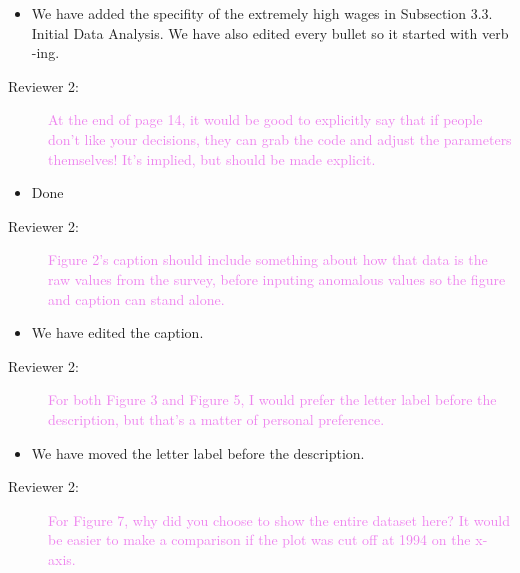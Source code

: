 \documentclass[12pt,a4paper,]{article}
\providecommand{\tightlist}{%
  \setlength{\itemsep}{0pt}\setlength{\parskip}{0pt}}
\begin{document}
\begin{itemize}
\tightlist
\item
  We have added the specifity of the extremely high wages in Subsection 3.3. Initial Data Analysis. We have also edited every bullet so it started with verb -ing.
\end{itemize}

\begin{description}
\item[Reviewer 2:]\textcolor{violet}{At the end of page 14, it would be good to explicitly say that if people don’t like your decisions, they can grab the code and adjust the parameters themselves! It’s implied, but should be made explicit.}
\end{description}

\begin{itemize}
\tightlist
\item
  Done
\end{itemize}

\begin{description}
\item[Reviewer 2:]\textcolor{violet}{Figure 2’s caption should include something about how that data is the raw values from the survey, before inputing anomalous values so the figure and caption can stand alone.}
\end{description}

\begin{itemize}
\tightlist
\item
  We have edited the caption.
\end{itemize}

\begin{description}
\item[Reviewer 2:]\textcolor{violet}{For both Figure 3 and Figure 5, I would prefer the letter label before the description, but that’s a matter of personal preference.}
\end{description}

\begin{itemize}
\tightlist
\item
  We have moved the letter label before the description.
\end{itemize}

\begin{description}
\item[Reviewer 2:]\textcolor{violet}{For Figure 7, why did you choose to show the entire dataset here? It would be easier to make a comparison if the plot was cut off at 1994 on the x-axis.}
\end{description}
\end{document}
